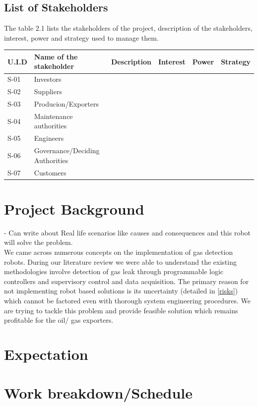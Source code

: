 \documentclass[a4paper]{article}
\begin{document}
\subsection{List of Stakeholders}
The table 2.1 lists the stakeholders of the project, description of the stakeholders, interest, power and strategy used to manage them.

\begin{tabular}{ |l|l|l|l|l|l|  }
 \hline
 U.I.D     & Name of the stakeholder &Description&Interest&Power&Strategy\\
 \hline
 S-01   & Investors    &&&&\\
 S-02   &Suppliers  &&&&\\
 S-03 &Producion/Exporters &&&&\\
 S-04    &Maintenance authorities &&&&\\
S-05&   Engineers  &&&&\\
 S-06& Governance/Deciding Authorities &&&&\\
 S-07& Customers&&&&\\
 \hline
\end{tabular}
\section {Project Background}
 - Can write about Real life scenarios like causes and consequences and this robot will solve the problem.\bigskip \\ 
 We came across numerous concepts on the implementation of gas detection robots. During our literature review we were able to understand the existing methodologies involve detection of gas leak through programmable logic controllers  and supervisory control and data acquisition. The primary reason for not implementing robot based solutions is its uncertainty (detailed in \ref{risks}) which cannot be factored even with thorough system engineering procedures. We are trying to tackle this problem and provide feasible solution which remains profitable for the oil/ gas exporters.  
\section{Expectation}

\section{Work breakdown/Schedule}
\end{document}
